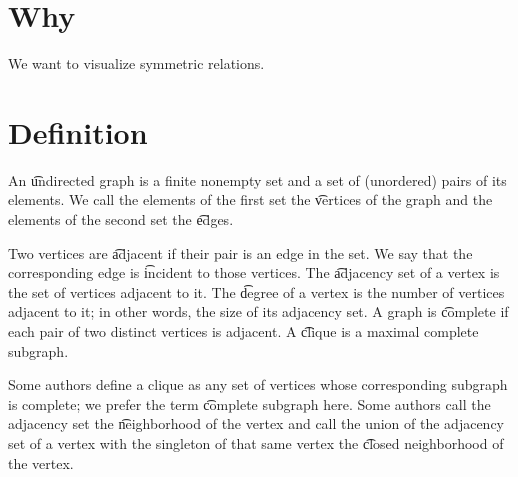 
\sbasic























\sstart
{}

\section{Why}

We want to visualize symmetric relations.

\section{Definition}

An \t{undirected graph} is a finite nonempty set and a set of (unordered) pairs of its elements.
We call the elements of the first set the \t{vertices} of the graph and the elements of the second set the \t{edges}.

Two vertices are \t{adjacent} if their pair is an edge in the set.
We say that the corresponding edge is \t{incident} to those vertices.
The \t{adjacency set} of a vertex is the set of vertices adjacent to it.
The \t{degree} of a vertex is the number of vertices adjacent to it; in other words, the size of its adjacency set.
A graph is \t{complete} if each pair of two distinct vertices is adjacent.
A \t{clique} is a maximal complete subgraph.


Some authors define a clique as any set of vertices whose corresponding subgraph is complete; we prefer the term \t{complete subgraph} here.
Some authors call the adjacency set the \t{neighborhood} of the vertex and call the union of the adjacency set of a vertex with the singleton of that same vertex the \t{closed neighborhood} of the vertex.

